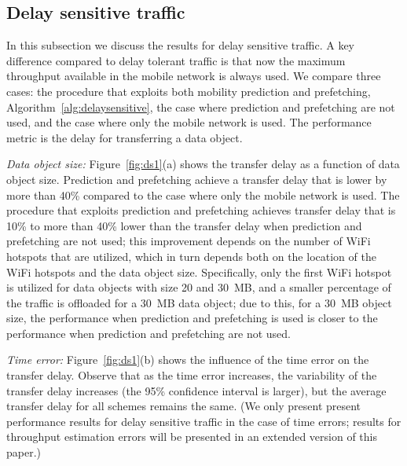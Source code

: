 \documentclass{sig-alternate}
\begin{document}
\subsection{Delay sensitive traffic}

In this subsection we discuss the  results for  delay sensitive traffic. A key difference compared to delay tolerant traffic is that now the maximum throughput available in the mobile network is always used.
We compare three cases: the procedure that exploits both mobility prediction and prefetching,  Algorithm~\ref{alg:delaysensitive},  the case where prediction and prefetching are not used, and the case where only the mobile network is used.
The performance metric is the delay for transferring a data object.

\medskip
\noindent
\emph{Data object size:} Figure~\ref{fig:ds1}(a) shows the transfer delay as a function of data object size. Prediction and prefetching achieve a transfer delay that is lower by more than 40\% compared to the case where only the mobile network is used.
The procedure that exploits prediction and prefetching achieves transfer delay that is 10\% to more than 40\% lower than the transfer delay when  prediction and  prefetching are not used; this improvement depends on the number of WiFi hotspots that are utilized, which in turn depends both on the location of the WiFi hotspots and the data object size. Specifically, only the first WiFi hotspot is utilized  for data objects with size 20 and 30~MB, and a smaller percentage of the traffic is offloaded for a 30~MB data object; due to this, for a 30~MB object size, the performance when prediction and prefetching is used is closer to  the performance when prediction and prefetching are not used.

\medskip
\noindent
\emph{Time error:} Figure~\ref{fig:ds1}(b) shows the influence of the time error on the transfer delay. Observe that as the time error increases, the variability of the transfer delay increases (the 95\% confidence interval is larger), but the average transfer delay for all schemes remains the same. (We only present present performance results for delay sensitive traffic in the case of time errors; results for throughput estimation errors will be presented in an extended version of this paper.)
\end{document}
